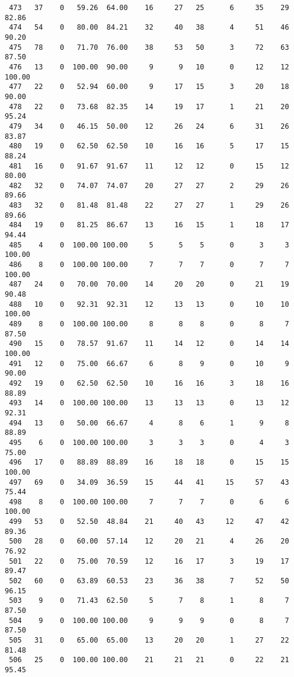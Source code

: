 \begin{verbatim}
 473   37    0   59.26  64.00    16     27   25      6     35    29    82.86
 474   54    0   80.00  84.21    32     40   38      4     51    46    90.20
 475   78    0   71.70  76.00    38     53   50      3     72    63    87.50
 476   13    0  100.00  90.00     9      9   10      0     12    12   100.00
 477   22    0   52.94  60.00     9     17   15      3     20    18    90.00
 478   22    0   73.68  82.35    14     19   17      1     21    20    95.24
 479   34    0   46.15  50.00    12     26   24      6     31    26    83.87
 480   19    0   62.50  62.50    10     16   16      5     17    15    88.24
 481   16    0   91.67  91.67    11     12   12      0     15    12    80.00
 482   32    0   74.07  74.07    20     27   27      2     29    26    89.66
 483   32    0   81.48  81.48    22     27   27      1     29    26    89.66
 484   19    0   81.25  86.67    13     16   15      1     18    17    94.44
 485    4    0  100.00 100.00     5      5    5      0      3     3   100.00
 486    8    0  100.00 100.00     7      7    7      0      7     7   100.00
 487   24    0   70.00  70.00    14     20   20      0     21    19    90.48
 488   10    0   92.31  92.31    12     13   13      0     10    10   100.00
 489    8    0  100.00 100.00     8      8    8      0      8     7    87.50
 490   15    0   78.57  91.67    11     14   12      0     14    14   100.00
 491   12    0   75.00  66.67     6      8    9      0     10     9    90.00
 492   19    0   62.50  62.50    10     16   16      3     18    16    88.89
 493   14    0  100.00 100.00    13     13   13      0     13    12    92.31
 494   13    0   50.00  66.67     4      8    6      1      9     8    88.89
 495    6    0  100.00 100.00     3      3    3      0      4     3    75.00
 496   17    0   88.89  88.89    16     18   18      0     15    15   100.00
 497   69    0   34.09  36.59    15     44   41     15     57    43    75.44
 498    8    0  100.00 100.00     7      7    7      0      6     6   100.00
 499   53    0   52.50  48.84    21     40   43     12     47    42    89.36
 500   28    0   60.00  57.14    12     20   21      4     26    20    76.92
 501   22    0   75.00  70.59    12     16   17      3     19    17    89.47
 502   60    0   63.89  60.53    23     36   38      7     52    50    96.15
 503    9    0   71.43  62.50     5      7    8      1      8     7    87.50
 504    9    0  100.00 100.00     9      9    9      0      8     7    87.50
 505   31    0   65.00  65.00    13     20   20      1     27    22    81.48
 506   25    0  100.00 100.00    21     21   21      0     22    21    95.45

\end{verbatim}
